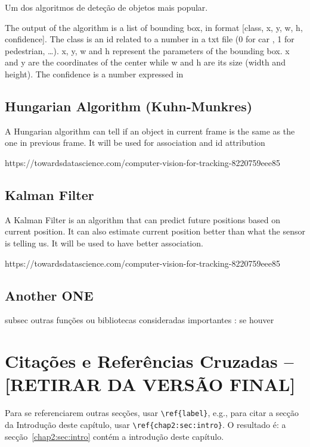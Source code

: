 Um dos algoritmos de deteção de objetos mais popular.



The output of the algorithm is a list of bounding box, in format [class, x, y, w, h, confidence]. The class is an id related to a number in a txt file (0 for car , 1 for pedestrian, …). x, y, w and h represent the parameters of the bounding box. x and y are the coordinates of the center while w and h are its size (width and height). The confidence is a number expressed in %



\subsection{Hungarian Algorithm (Kuhn-Munkres)}
\label{chap2:subsec:hungarian}

A Hungarian algorithm can tell if an object in current frame is the same as the one in previous frame. It will be used for association and id attribution

https://towardsdatascience.com/computer-vision-for-tracking-8220759eee85

\subsection{Kalman Filter}
\label{chap2:subsec:kalman}


A Kalman Filter is an algorithm that can predict future positions based on current position. It can also estimate current position better than what the sensor is telling us. It will be used to have better association.

https://towardsdatascience.com/computer-vision-for-tracking-8220759eee85

\subsection{Another ONE}

subsec outras funções ou bibliotecas consideradas importantes : se houver


\section{Citações e Referências Cruzadas -- [RETIRAR DA VERSÃO FINAL]}
\label{chap2:sec:citacoes}

Para se referenciarem outras secções, usar \texttt{\textbackslash{}ref\{label\}}, e.g., para citar a secção da Introdução deste capítulo, usar \texttt{\textbackslash{}ref\{chap2:sec:intro\}}. O resultado é: a secção~\ref{chap2:sec:intro} contém a introdução deste capítulo.

